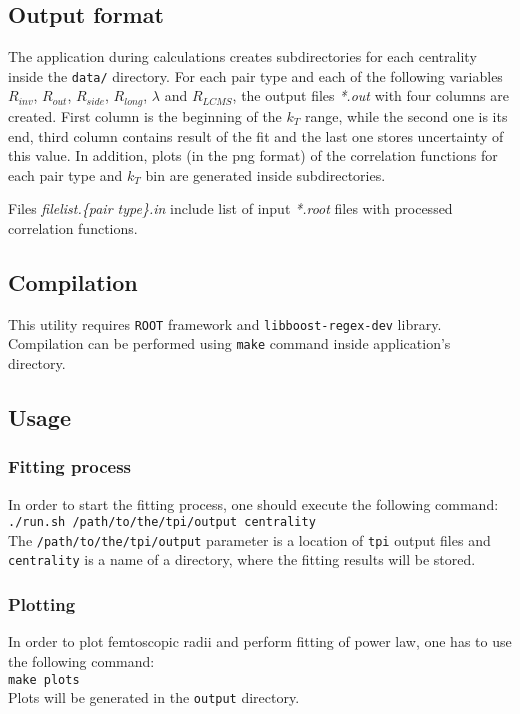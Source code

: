     \subsection{Output format}
      The application during calculations creates subdirectories for each centrality inside the \verb|data/| directory.
      For each pair type and each of the following variables $R_{inv}$, $R_{out}$, $R_{side}$, $R_{long}$, $\lambda$ and $R_{LCMS}$, the output files \textit{*.out} with four columns are created.
      First column is the beginning of the $k_T$ range, while the second one is its end, third column contains result of the fit and the last one stores uncertainty of this value.
      In addition, plots (in the png format) of the correlation functions for each pair type and $k_T$ bin are generated inside subdirectories.

      Files \textit{filelist.\{pair type\}.in} include list of input \textit{*.root} files with processed correlation functions.
    \subsection{Compilation}
      This utility requires \verb|ROOT| framework and \verb|libboost-regex-dev| library.
      Compilation can be performed using \verb|make| command inside application's directory.
    \subsection{Usage}
      \subsubsection{Fitting process}
        In order to start the fitting process, one should execute the following command:\\
        \verb|./run.sh /path/to/the/tpi/output centrality|\\
        The \verb|/path/to/the/tpi/output| parameter is a location of \verb|tpi| output files and \verb|centrality| is a name of a directory, where the fitting results will be stored.
      \subsubsection{Plotting}
        In order to plot femtoscopic radii and perform fitting of power law, one has to use the following command:\\
        \verb|make plots|\\
        Plots will be generated in the \verb|output| directory.

